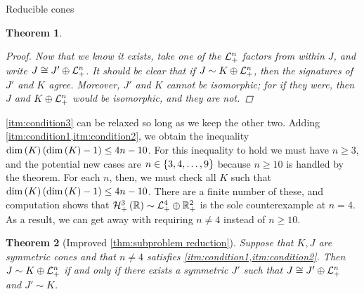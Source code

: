 \documentclass{interact}
\theoremstyle{plain}
\newtheorem{theorem}{Theorem}[section]
\theoremstyle{definition}
\theoremstyle{remark}
\begin{document}
\begin{section}{Reducible cones}
\begin{theorem}
\begin{proof}
        Now that we know it exists, take one of the $\mathcal{L}^{{n}}_{+}$ factors
        from within $J$, and write $J \cong
        {J'}\oplus{ \mathcal{L}^{{n}}_{+} }$. It should be clear that if $J \sim
        {K}\oplus{ \mathcal{L}^{{n}}_{+} }$, then the signatures of $J'$ and $K$
        agree. Moreover, $J'$ and $K$ cannot be isomorphic; for if
        they were, then $J$ and ${K}\oplus{ \mathcal{L}^{{n}}_{+} }$ would be
        isomorphic, and they are not.
      \end{proof}
    \end{theorem}

    \cref{itm:condition3} can be relaxed so long as we keep the other
    two. Adding \cref{itm:condition1,itm:condition2}, we obtain the
    inequality $\dim\left({K}\right)\left({\dim\left({K}\right) - 1}\right) \le 4n - 10$. For this
    inequality to hold we must have $n \ge 3$, and the potential new
    cases are $n \in \left\lbrace{3,4,\ldots,9}\right\rbrace$ because $n \ge 10$ is
    handled by the theorem. For each $n$, then, we must check all $K$
    such that $\dim\left({K}\right)\left({\dim\left({K}\right) - 1}\right) \le 4n - 10$. There are
    a finite number of these, and computation shows that
    $\Hnplus[3]\of{\Rn[1]} \sim \directsum{\Lnplus[4]}{\Rnplus[2]}$ is
    the sole counterexample at $n = 4$. As a result, we can get away
    with requiring $n \ne 4$ instead of $n \ge 10$.

    \begin{theorem}[Improved \cref{thm:subproblem reduction}]\label{thm:improved subproblem reduction}
      Suppose that $K,J$ are symmetric cones and that $n \ne 4$
      satisfies \cref{itm:condition1,itm:condition2}. Then $J \sim
      {K}\oplus{ \mathcal{L}^{{n}}_{+} }$ if and only if there exists a symmetric
      $J'$ such that $J \cong {J'}\oplus{ \mathcal{L}^{{n}}_{+} }$ and $J' \sim
      K$.


\end{theorem}
\end{section}
\end{document}
